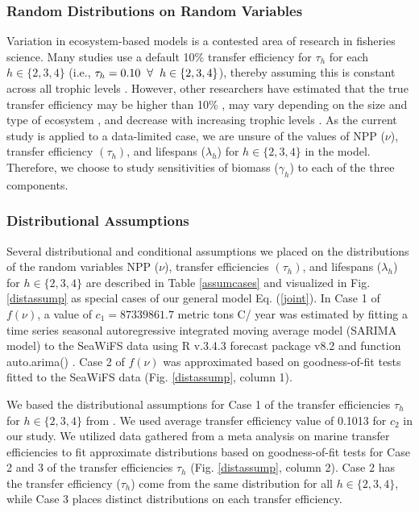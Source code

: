 \documentclass[oneside,12pt,final]{sty/ucthesis-CA2012}
\let\cite\citep                             %
\begin{document}
\begin{mainmatter}
\subsubsection{Random Distributions on Random Variables}
Variation in ecosystem-based models is a contested area of research in fisheries science. Many studies use a default 10\% transfer efficiency for $\tau_h$ for each $h \in \{2, 3, 4\}$ (i.e., $\tau_h = 0.10 \hspace{2mm} \forall \hspace{2mm} h \in \{2, 3, 4\}$), thereby assuming this is constant across all trophic levels \cite{lindeman1942trophic, slobodkin1962energy, may1976theoretical, pauly1995primary}. However, other researchers have estimated that the true transfer efficiency may be higher than 10\% \cite{schaefer1965potential, ryther1969photosynthesis,sheldon1977structure, baumann1995comment}, may vary depending on the size and type of ecosystem \cite{libralato2008novel, heymans2011ecopath}, and decrease with increasing trophic levels \cite{may1983ecology, barnes2010global}. As the current study is applied to a data-limited case, we are unsure of the values of NPP ($\nu$), transfer efficiency $(\tau_h)$, and lifespans ($\lambda_h$) for $h \in \{2, 3, 4\}$ in the model. Therefore, we choose to study sensitivities of biomass ($\gamma_h$) to each of the three components.

\subsubsection{Distributional Assumptions}
Several distributional and conditional assumptions we placed on the distributions of the random variables NPP ($\nu$), transfer efficiencies $(\tau_h)$, and lifespans ($\lambda_h$) for $h \in \{2, 3, 4\}$ are described in Table \ref{assumcases} and visualized in Fig. \ref{distassump} as special cases of our general model Eq. (\ref{joint}). In Case 1 of $f(\nu)$, a value of $c_1 = 87339861.7$ metric tons C/ year was estimated by fitting a time series seasonal autoregressive integrated moving average model (SARIMA model) to the SeaWiFS data using R v.3.4.3 \cite{Rcite} forecast package v8.2 and function auto.arima() \cite{forecast1, forecast2}. Case 2 of $f(\nu)$ was approximated based on goodness-of-fit tests fitted to the SeaWiFS data \cite{fitdistrplus} (Fig. \ref{distassump}, column 1). 

\vspace{5mm}

We based the distributional assumptions for Case 1 of the transfer efficiencies $\tau_h$ for $h \in \{2, 3, 4\}$ from \citet{pauly1995primary}. We used \citet{pauly1995primary} average transfer efficiency value of 0.1013 for $c_2$ in our study. We utilized data gathered from a meta analysis on marine transfer efficiencies to fit approximate distributions based on goodness-of-fit tests \cite{fitdistrplus} for Case 2 and 3 of the transfer efficiencies $\tau_h$ (Fig. \ref{distassump}, column 2). Case 2 has the transfer efficiency ($\tau_h$) come from the same distribution for all $h \in \{2, 3, 4\}$, while Case 3 places distinct distributions on each transfer efficiency.


\end{mainmatter}
\end{document}
